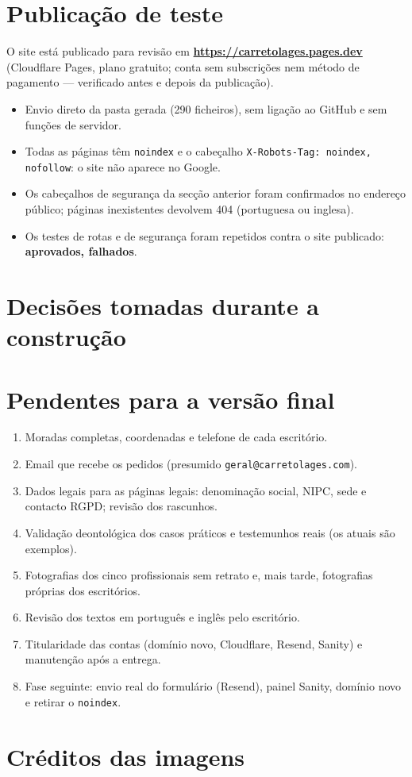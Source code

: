 \documentclass[11pt,a4paper]{article}
\begin{document}
\section{Publicação de teste}
O site está publicado para revisão em \textbf{\url{https://carretolages.pages.dev}} (Cloudflare Pages, plano
gratuito; conta sem subscrições nem método de pagamento --- verificado antes e depois da publicação).
\begin{itemize}
  \item Envio direto da pasta gerada (290 ficheiros), sem ligação ao GitHub e sem funções de servidor.
  \item Todas as páginas têm \texttt{noindex} e o cabeçalho \texttt{X-Robots-Tag: noindex, nofollow}: o site não aparece no Google.
  \item Os cabeçalhos de segurança da secção anterior foram confirmados no endereço público; páginas inexistentes devolvem 404 (portuguesa ou inglesa).
  \item Os testes de rotas e de segurança foram repetidos contra o site publicado: \textbf{\resLivePassed{} aprovados, \resLiveFailed{} falhados}.
\end{itemize}

\section{Decisões tomadas durante a construção}


\section{Pendentes para a versão final}\label{sec:pendentes}
\begin{enumerate}
  \item Moradas completas, coordenadas e telefone de cada escritório.
  \item Email que recebe os pedidos (presumido \texttt{geral@carretolages.com}).
  \item Dados legais para as páginas legais: denominação social, NIPC, sede e contacto RGPD; revisão dos rascunhos.
  \item Validação deontológica dos casos práticos e testemunhos reais (os atuais são exemplos).
  \item Fotografias dos cinco profissionais sem retrato e, mais tarde, fotografias próprias dos escritórios.
  \item Revisão dos textos em português e inglês pelo escritório.
  \item Titularidade das contas (domínio novo, Cloudflare, Resend, Sanity) e manutenção após a entrega.
  \item Fase seguinte: envio real do formulário (Resend), painel Sanity, domínio novo e retirar o \texttt{noindex}.
\end{enumerate}

\section{Créditos das imagens}



\end{document}
